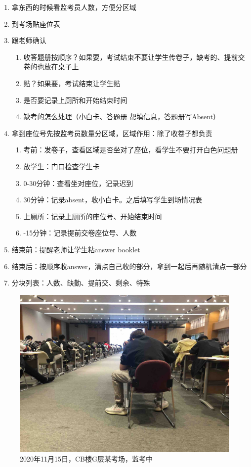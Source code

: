 \begin{enumerate}
    \item 拿东西的时候看监考员人数，方便分区域
    \item 到考场贴座位表
    \item 跟老师确认
    \begin{enumerate}
        \item 收答题册按顺序？如果要，考试结束不要让学生传卷子，缺考的、提前交卷的也放在桌子上
        \item 贴？如果要，考试结束让学生贴
        \item 是否要记录上厕所和开始结束时间
        \item 缺考的怎么处理（小白卡、答题册 帮填信息，答题册写Absent）
    \end{enumerate}
    \item 拿到座位号先按监考员数量分区域，区域作用：除了收卷子都负责
    \begin{enumerate}
        \item 考前：发卷子，查看区域是否坐对了座位，看学生不要打开白色问题册
        \item 放学生：门口检查学生卡
        \item 0-30分钟：查看坐对座位，记录迟到
        \item 30分钟：记录absent，收小白卡。之后填写学生到场情况表
        \item 上厕所：记录上厕所的座位号、开始结束时间
        \item -15分钟：记录提前交卷座位号、人数
    \end{enumerate}
    \item 结束前：提醒老师让学生粘answer booklet
    \item 结束后：按顺序收answer，清点自己收的部分，拿到一起后再随机清点一部分
    \item 分块列表：人数、缺勤、提前交、剩余、特殊
\end{enumerate}




\begin{figure}[H]
    \centering
    \includegraphics[width=\columnwidth]{author-folder/Kai.Wu/invigilation.jpg}
    \caption{2020年11月15日，CB楼G层某考场，监考中}
\end{figure}

